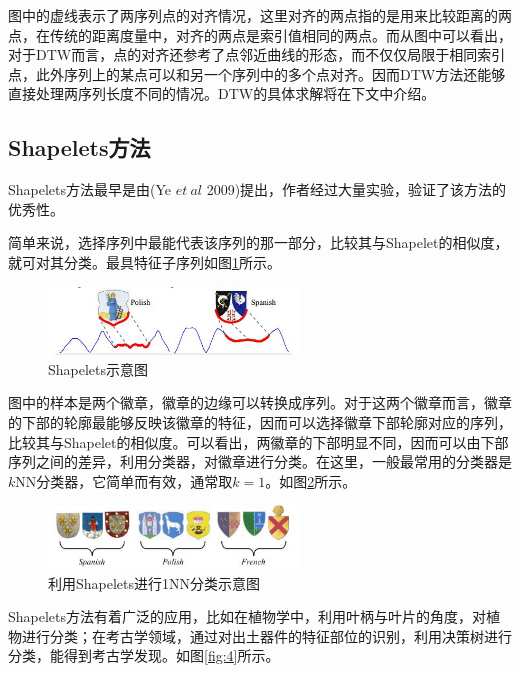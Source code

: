 图中的虚线表示了两序列点的对齐情况，这里对齐的两点指的是用来比较距离的两点，在传统的距离度量中，对齐的两点是索引值相同的两点。而从图中可以看出，对于DTW而言，点的对齐还参考了点邻近曲线的形态，而不仅仅局限于相同索引点，此外序列上的某点可以和另一个序列中的多个点对齐。因而DTW方法还能够直接处理两序列长度不同的情况。DTW的具体求解将在下文中介绍。

\subsection{Shapelets方法}
Shapelets方法最早是由(Ye $et~al$ 2009)提出，作者经过大量实验，验证了该方法的优秀性\cite{Shapelets_website}。

简单来说，选择序列中最能代表该序列的那一部分，比较其与Shapelet的相似度，就可对其分类。最具特征子序列如图\ref{fig:2}所示。

\begin{figure}[t]
  \centering
  \includegraphics[width=0.6\textwidth]{./figure/shapelets.png}
  \caption{Shapelets示意图}\label{fig:2}
\end{figure}

图中的样本是两个徽章，徽章的边缘可以转换成序列。对于这两个徽章而言，徽章的下部的轮廓最能够反映该徽章的特征，因而可以选择徽章下部轮廓对应的序列，比较其与Shapelet的相似度。可以看出，两徽章的下部明显不同，因而可以由下部序列之间的差异，利用分类器，对徽章进行分类。在这里，一般最常用的分类器是$k$NN分类器，它简单而有效，通常取$k=1$\cite{Xi2006}。如图\ref{fig:3}所示。

\begin{figure}[t]
  \centering
  \includegraphics[width=0.6\textwidth]{./figure/shapeletsclassify.JPG}
  \caption{利用Shapelets进行1NN分类示意图}\label{fig:3}
\end{figure}

Shapelets方法有着广泛的应用，比如在植物学中，利用叶柄与叶片的角度，对植物进行分类；在考古学领域，通过对出土器件的特征部位的识别，利用决策树进行分类，能得到考古学发现\cite{anthropology}。如图\ref{fig:4}所示。

